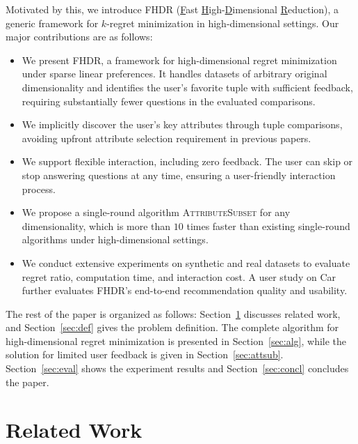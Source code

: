 \documentclass[conference]{IEEEtran}
\theoremstyle{definition}
\theoremstyle{plain}
\begin{document}
Motivated by this, we introduce FHDR (\underline{F}ast \underline{H}igh-\underline{D}imensional \underline{R}eduction), a generic framework for $k$-regret minimization in high-dimensional settings. Our major contributions are as follows:
\begin{itemize}
    \item We present FHDR, a framework for high-dimensional regret minimization under sparse linear preferences. It handles datasets of arbitrary original dimensionality and identifies the user's favorite tuple with sufficient feedback, requiring substantially fewer questions in the evaluated comparisons.
    \item We implicitly discover the user's key attributes through tuple comparisons, avoiding upfront attribute selection requirement in previous papers.
    \item We support flexible interaction, including zero feedback. The user can skip or stop answering questions at any time, ensuring a user-friendly interaction process.
    \item We propose a single-round algorithm \textsc{AttributeSubset} for any dimensionality, which is more than $10$ times faster than existing single-round algorithms under high-dimensional settings.
    \item We conduct extensive experiments on synthetic and real datasets to evaluate regret ratio, computation time, and interaction cost. A user study on Car further evaluates FHDR's end-to-end recommendation quality and usability.
\end{itemize}

The rest of the paper is organized as follows: Section~\ref{sec:related} discusses related work, and Section~\ref{sec:def} gives the problem definition. The complete algorithm for high-dimensional regret minimization is presented in Section~\ref{sec:alg}, while the solution for limited user feedback is given in Section~\ref{sec:attsub}. Section~\ref{sec:eval} shows the experiment results and Section~\ref{sec:concl} concludes the paper.




\section{Related Work}
\label{sec:related}
\end{document}
